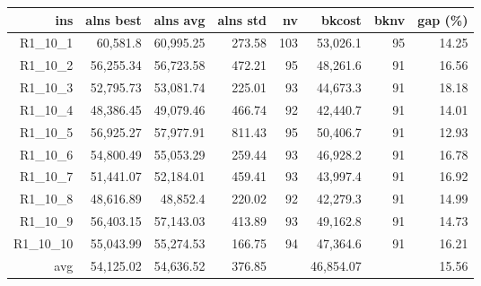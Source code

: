   \begin{table}[caption={Kết quả đo với tập HG\_R\_1\_10 1000 yêu cầu}, label=exp:HGR110]
    \small
    \centering
    \begin{tabular}{rrrrrrrr}
    \hline
    ins & alns best & alns avg & alns std & nv & bkcost & bknv & gap (\%) \\ \hline
    R1\_10\_1 & 60,581.8 & 60,995.25 & 273.58 & 103 & 53,026.1 & 95 & 14.25 \\ \hline
    R1\_10\_2 & 56,255.34 & 56,723.58 & 472.21 & 95 & 48,261.6 & 91 & 16.56 \\ \hline
    R1\_10\_3 & 52,795.73 & 53,081.74 & 225.01 & 93 & 44,673.3 & 91 & 18.18 \\ \hline
    R1\_10\_4 & 48,386.45 & 49,079.46 & 466.74 & 92 & 42,440.7 & 91 & 14.01 \\ \hline
    R1\_10\_5 & 56,925.27 & 57,977.91 & 811.43 & 95 & 50,406.7 & 91 & 12.93 \\ \hline
    R1\_10\_6 & 54,800.49 & 55,053.29 & 259.44 & 93 & 46,928.2 & 91 & 16.78 \\ \hline
    R1\_10\_7 & 51,441.07 & 52,184.01 & 459.41 & 93 & 43,997.4 & 91 & 16.92 \\ \hline
    R1\_10\_8 & 48,616.89 & 48,852.4 & 220.02 & 92 & 42,279.3 & 91 & 14.99 \\ \hline
    R1\_10\_9 & 56,403.15 & 57,143.03 & 413.89 & 93 & 49,162.8 & 91 & 14.73 \\ \hline
    R1\_10\_10 & 55,043.99 & 55,274.53 & 166.75 & 94 & 47,364.6 & 91 & 16.21 \\ \hline
    avg & 54,125.02 & 54,636.52 & 376.85 & & 46,854.07 & & 15.56 \\ \hline
    \end{tabular}
  \end{table}

